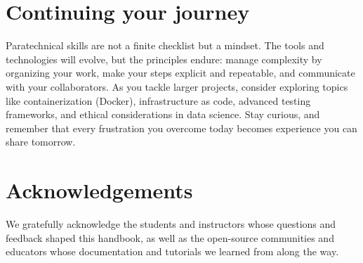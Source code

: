 \section*{Continuing your journey}
Paratechnical skills are not a finite checklist but a mindset.  The tools and technologies will evolve, but the principles endure: manage complexity by organizing your work, make your steps explicit and repeatable, and communicate with your collaborators.  As you tackle larger projects, consider exploring topics like containerization (Docker), infrastructure as code, advanced testing frameworks, and ethical considerations in data science.  Stay curious, and remember that every frustration you overcome today becomes experience you can share tomorrow.

\section*{Acknowledgements}
We gratefully acknowledge the students and instructors whose questions and feedback shaped this handbook, as well as the open-source communities and educators whose documentation and tutorials we learned from along the way.
